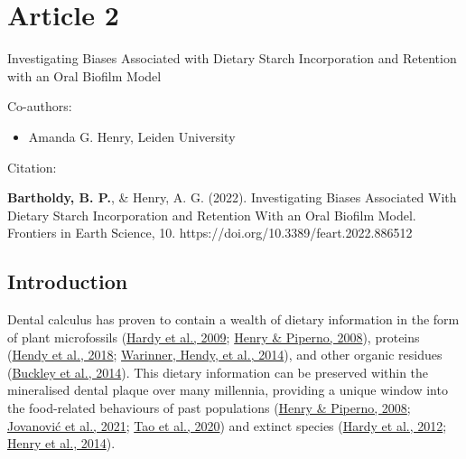 \documentclass[
  letterpaper,
]{book}
\providecommand{\tightlist}{%
  \setlength{\itemsep}{0pt}\setlength{\parskip}{0pt}}
\begin{document}

\hypertarget{article-2}{%
\chapter{Article 2}\label{article-2}}

Investigating Biases Associated with Dietary Starch Incorporation and
Retention with an Oral Biofilm Model

\hfill\break

Co-authors:

\begin{itemize}
\tightlist
\item
  Amanda G. Henry, Leiden University
\end{itemize}

\vfill

Citation:

\textbf{Bartholdy, B. P.}, \& Henry, A. G. (2022). Investigating Biases
Associated With Dietary Starch Incorporation and Retention With an Oral
Biofilm Model. Frontiers in Earth Science, 10.
https://doi.org/10.3389/feart.2022.886512

\newpage{}

\hypertarget{byocstarch-intro}{%
\section{Introduction}\label{byocstarch-intro}}

Dental calculus has proven to contain a wealth of dietary information in
the form of plant microfossils
(\protect\hyperlink{ref-hardyStarchGranules2009}{Hardy et al., 2009};
\protect\hyperlink{ref-henryCalculusSyria2008}{Henry \& Piperno, 2008}),
proteins (\protect\hyperlink{ref-hendyProteomicCalculus2018}{Hendy et
al., 2018}; \protect\hyperlink{ref-warinnerEvidenceMilk2014}{Warinner,
Hendy, et al., 2014}), and other organic residues
(\protect\hyperlink{ref-buckleyDentalCalculus2014}{Buckley et al.,
2014}). This dietary information can be preserved within the mineralised
dental plaque over many millennia, providing a unique window into the
food-related behaviours of past populations
(\protect\hyperlink{ref-henryCalculusSyria2008}{Henry \& Piperno, 2008};
\protect\hyperlink{ref-jovanovicNeolithicCalculus2021}{Jovanović et al.,
2021}; \protect\hyperlink{ref-taoWheatCalculus2020}{Tao et al., 2020})
and extinct species
(\protect\hyperlink{ref-hardyNeanderthalMedics2012}{Hardy et al., 2012};
\protect\hyperlink{ref-henryNeanderthalCalculus2014}{Henry et al.,
2014}).
\end{document}
